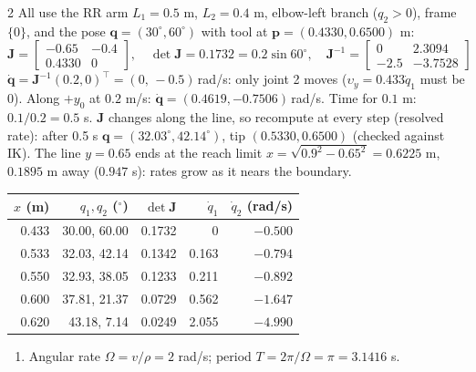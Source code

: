 \begin{multicols}{2}
All use the RR arm $L_1=0.5$ m, $L_2=0.4$ m, elbow-left branch ($q_2>0$), frame $\{0\}$, and the pose $\mathbf q=(30^\circ,60^\circ)$ with tool at $\mathbf p=(0.4330,0.6500)$ m:
\[\mathbf J=\begin{bmatrix}-0.65&-0.4\\0.4330&0\end{bmatrix},\quad\det\mathbf J=0.1732=0.2\sin60^\circ,\quad\mathbf J^{-1}=\begin{bmatrix}0&2.3094\\-2.5&-3.7528\end{bmatrix}\]
$\dot{\mathbf q}=\mathbf J^{-1}(0.2,0)^\top=(0,\,-0.5)$\,rad/s: only joint 2 moves ($\upsilon_y=0.433\dot q_1$ must be $0$). Along $+y_0$ at $0.2$ m/s: $\dot{\mathbf q}=(0.4619,-0.7506)$\,rad/s. Time for $0.1$ m: $0.1/0.2=0.5$ s. $\mathbf J$ changes along the line, so recompute at every step (resolved rate): after 0.5 s $\mathbf q=(32.03^\circ,42.14^\circ)$, tip $(0.5330,0.6500)$ (checked against IK). The line $y=0.65$ ends at the reach limit $x=\sqrt{0.9^2-0.65^2}=0.6225$ m, $0.1895$ m away ($0.947$ s): rates grow as it nears the boundary.
\begin{center}\small
\begin{tabular}{@{}rrrrr@{}}\toprule $x$ (m)&$q_1,q_2$ ($^\circ$)&$\det\mathbf J$&$\dot q_1$&$\dot q_2$ (rad/s)\\\midrule
0.433&30.00, 60.00&0.1732&0&$-0.500$\\0.533&32.03, 42.14&0.1342&0.163&$-0.794$\\0.550&32.93, 38.05&0.1233&0.211&$-0.892$\\0.600&37.81, 21.37&0.0729&0.562&$-1.647$\\0.620&43.18, 7.14&0.0249&2.055&$-4.990$\\\bottomrule\end{tabular}
\end{center}
\begin{recipe}[circle]
\begin{enumerate}
\item Angular rate $\Omega=v/\rho=2$ rad/s; period $T=2\pi/\Omega=\pi=3.1416$ s.

\end{enumerate}
\end{recipe}
\end{multicols}
